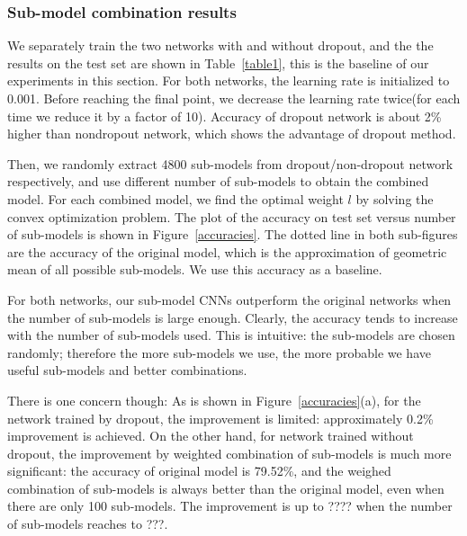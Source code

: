 \documentclass{article} %
\begin{document}
\subsubsection{Sub-model combination results}
We separately train the two networks with and without dropout, and the the results on the test set are shown in Table~\ref{table1}, this is the baseline of our experiments in this section.  For both networks, the learning rate is initialized to 0.001. Before reaching the final point, we decrease the learning rate twice(for each time we reduce it by a factor of 10).  Accuracy of dropout network is about 2\% higher than nondropout network, which shows the advantage of dropout method.
\par
Then, we randomly extract 4800 sub-models from dropout/non-dropout network respectively, and use different number of sub-models to obtain the combined model. For each combined model, we find the optimal weight $l$ by solving the convex optimization problem. The plot of the accuracy on test set versus number of sub-models is shown in Figure~\ref{accuracies}. The dotted line in both sub-figures are the accuracy of the original model, which is the approximation of geometric mean of all possible sub-models. We use this accuracy as a baseline.
\par 
For both networks, our sub-model CNNs outperform the original networks when the number of sub-models is large enough. Clearly, the accuracy tends to increase with the number of sub-models used. This is intuitive: the sub-models are chosen randomly; therefore the more sub-models we use, the more probable we have useful sub-models and better combinations. 
\par
There is one concern though: As is shown in Figure~\ref{accuracies}(a), for the network trained by dropout, the improvement is limited: approximately 0.2\% improvement is achieved. On the other hand, for network trained without dropout, the improvement by weighted combination of sub-models is much more significant: the accuracy of original model is 79.52\%, and the weighed combination of sub-models is always better than the original model, even when there are only 100 sub-models. The improvement is up to ???? when the number of sub-models reaches to ???.
\par
\end{document}
